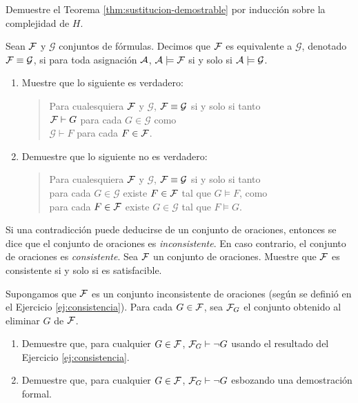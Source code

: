 \documentclass[12pt,a4paper]{book}
\newcommand{\GG}{\mathcal{G}}
\begin{document}
    \begin{ejercicio}\label{ej:sustitucion-demostrable-completa}
        Demuestre el Teorema \ref{thm:sustitucion-demostrable} por inducción sobre la complejidad de $H$.
    \end{ejercicio}

    \begin{ejercicio}
        Sean $\FF$ y $\GG$ conjuntos de fórmulas. Decimos que $\FF$ es equivalente a $\GG$, denotado $\FF\equiv\GG$, si para
        toda asignación $\AA$, $\AA\models\FF$ si y solo si $\AA\models\GG$.
        \begin{enumerate}[label=(\alph*)]
            \item Muestre que lo siguiente es verdadero:
            \begin{quote}
                Para cualesquiera $\FF$ y $\GG$, $\FF\equiv\GG$ si y solo si tanto\\
                $\FF\vdash G$ para cada $G\in\GG$ como\\
                $\GG\vdash F$ para cada $F\in\FF$.
            \end{quote}
            \item Demuestre que lo siguiente no es verdadero:
            \begin{quote}
                Para cualesquiera $\FF$ y $\GG$, $\FF\equiv\GG$ si y solo si tanto\\
                para cada $G\in\GG$ existe $F\in\FF$ tal que $G\models F$, como\\
                para cada $F\in\FF$ existe $G\in\GG$ tal que $F\models G$.
            \end{quote}
        \end{enumerate}
    \end{ejercicio}

    \begin{ejercicio}\label{ej:consistencia}
        Si una contradicción puede deducirse de un conjunto de oraciones, entonces se dice que el conjunto de oraciones
        es \textit{inconsistente}. En caso contrario, el conjunto de oraciones es \textit{consistente}. Sea $\FF$ un
        conjunto de oraciones. Muestre que $\FF$ es consistente si y solo si es satisfacible.
    \end{ejercicio}

    \begin{ejercicio}
        Supongamos que $\FF$ es un conjunto inconsistente de oraciones (según se definió en el Ejercicio
        \ref{ej:consistencia}). Para cada $G\in\FF$, sea $\FF_{G}$ el conjunto obtenido al eliminar $G$ de $\FF$.
        \begin{enumerate}[label=(\alph*)]
            \item Demuestre que, para cualquier $G\in\FF$, $\FF_{G}\vdash\neg G$ usando el resultado del Ejercicio
            \ref{ej:consistencia}.
            \item Demuestre que, para cualquier $G\in\FF$, $\FF_{G}\vdash\neg G$ esbozando una demostración formal.
        \end{enumerate}
    \end{ejercicio}
\end{document}
